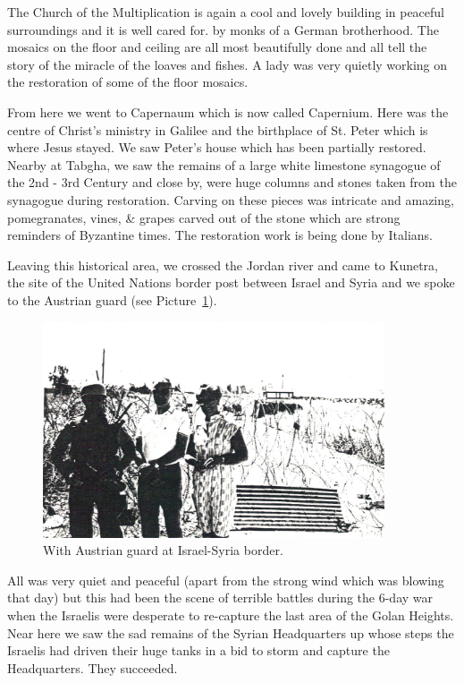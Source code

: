The Church of the Multiplication is again a cool and lovely building
in peaceful surroundings and it is well cared for. by monks of a
German brotherhood. The mosaics on the floor and ceiling are all most
beautifully done and all tell the story of the miracle of the loaves
and fishes. A lady was very quietly working on the restoration of some
of the floor mosaics.

From here we went to Capernaum which is now called Capernium. Here was
the centre of Christ's ministry in Galilee and the birthplace of
St. Peter which is where Jesus stayed. We saw Peter's house which has
been partially restored. Nearby at Tabgha, we saw the remains of a
large white limestone synagogue of the 2nd - 3rd Century and close by,
were huge columns and stones taken from the synagogue during
restoration. Carving on these pieces was intricate and amazing,
pomegranates, vines, \& grapes carved out of the stone which are
strong reminders of Byzantine times. The restoration work is being
done by Italians.

Leaving this historical area, we crossed the Jordan river and came to
Kunetra, the site of the United Nations border post between Israel and
Syria and we spoke to the Austrian guard (see Picture~\ref{israel1}).

\begin{figure}
  \centering
  \includegraphics[width=0.9\textwidth]{photos/israel1}
  \caption{With Austrian guard at Israel-Syria border.}
  \label{israel1}
\end{figure}

All was very quiet and peaceful (apart from the strong wind which was
blowing that day) but this had been the scene of terrible battles
during the 6-day war when the Israelis were desperate to re-capture
the last area of the Golan Heights. Near here we saw the sad remains
of the Syrian Headquarters up whose steps the Israelis had driven
their huge tanks in a bid to storm and capture the Headquarters. They
succeeded.

